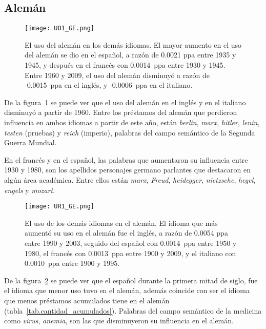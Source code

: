 \subsection{Alemán} %

\begin{figure}[h!]
	\centering
	\texttt{[image: UO1\_GE.png]}
	\caption{El uso del alemán en los demás idiomas. El mayor aumento en el uso del alemán se dio en el español, a razón de 0.0021 ppa entre 1935 y 1945, y después en el francés con 0.0014~ppa entre 1930 y 1945.  Entre 1960 y 2009, el uso del alemán disminuyó  a razón de -0.0015~ppa en el inglés, y -0.0006~ppa en el italiano.}
	\label{fig.UO_GE}

\end{figure}



De la figura~\ref{fig.UO_GE} se puede ver que el uso del alemán en el
inglés y en el italiano disminuyó a partir de 1960. Entre los préstamos del alemán que perdieron influencia en ambos idiomas a partir de este año, están \textit{berlin}, \textit{marx}, \textit{hitler}, \textit{lenin}, \textit{testen} (pruebas) y \textit{reich} (imperio), palabras del campo semántico de la Segunda Guerra Mundial. 

En el francés y en el español, las palabras que aumentaron su influencia entre 1930 y 1980,  son los apellidos personajes germano parlantes que destacaron en algún área académica. Entre ellos están \textit{marx}, \textit{Freud}, \textit{heidegger}, \textit{nietzsche}, \textit{hegel}, \textit{engels} y \textit{mozart}.

\label{GE-D}


\begin{figure}[h!]
	\centering
	\texttt{[image: UR1\_GE.png]}
	\caption{El uso de los demás idiomas en el alemán. El idioma que más aumentó su uso en el alemán fue el inglés, a razón de 0.0054 ppa  entre 1990 y 2003, seguido del español con 0.0014~ppa entre 1950 y 1980, el francés con 0.0013~ppa entre 1900 y 2009, y el italiano con 0.0010~ppa entre 1900 y 1995.}
	\label{fig.UR_GE}
\end{figure}

De la figura~\ref{fig.UR_GE} se puede ver que el español durante la primera mitad de siglo, fue el idioma que menor uso tuvo en el alemán, además coincide con ser el idioma que menos préstamos acumulados tiene en el alemán (tabla~\ref{tab.cantidad_acumulados}). Palabras del campo semántico de la medicina como \textit{virus}, \textit{anemia}, son las que disminuyeron su influencia en el alemán. 

